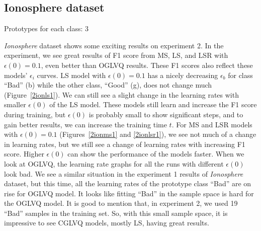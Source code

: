 \subsection{Ionosphere dataset}

Prototypes for each class: 3
\vspace{5pt}


\textit{Ionosphere} dataset shows some exciting results on experiment 2. In the experiment, we see great results of F1 score from MS, LS, and LSR with $\epsilon(0)= 0.1$, even better than OGLVQ results. These F1 scores also reflect these models’ $\epsilon_{i}$ curves. LS model with $\epsilon(0)= 0.1$ has a nicely decreasing $\epsilon_{b}$ for class “Bad” (b) while the other class, “Good” (g), does not change much (Figure~\ref{2ionls1}). We can still see a slight change in the learning rates with smaller $\epsilon(0)$ of the LS model. These models still learn and increase the F1 score during training, but $\epsilon(0)$ is probably small to show significant steps, and to gain better results, we can increase the training time $t$. For MS and LSR models with $\epsilon(0)= 0.1$ (Figures~\ref{2ionms1} and \ref{2ionlsr1}), we see not much of a change in learning rates, but we still see a change of learning rates with increasing F1 score. Higher $\epsilon(0)$ can show the performance of the models faster. When we look at OGLVQ, the learning rate graphs for all the runs with different $\epsilon(0)$ look bad. We see a similar situation in the experiment 1 results of \textit{Ionosphere} dataset, but this time, all the learning rates of the prototype class “Bad” are on rise for OGLVQ model. It looks like fitting “Bad” in the sample space is hard for the OGLVQ model. It is good to mention that, in experiment 2, we used 19 “Bad” samples in the training set. So, with this small sample space, it is impressive to see CGLVQ models, mostly LS, having great results.



